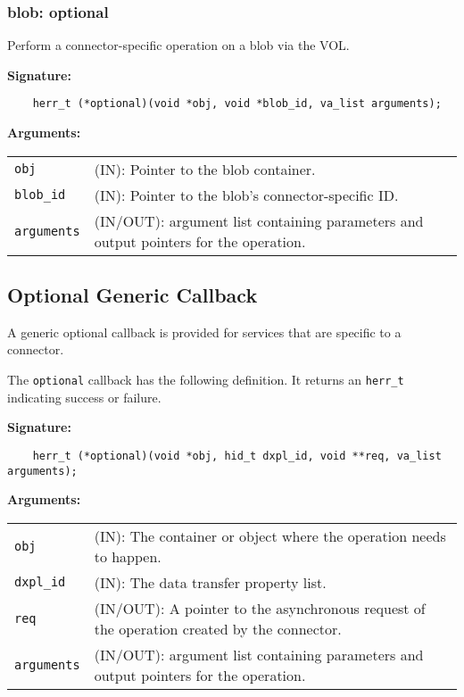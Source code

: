 \subsubsection{blob: optional}
Perform a connector-specific operation on a blob via the VOL.

\begin{mdframed}[style=bgbox]
\textbf{Signature:}
\begin{lstlisting}
    herr_t (*optional)(void *obj, void *blob_id, va_list arguments);             
\end{lstlisting}

\textbf{Arguments:}\\
\begin{tabular}{l p{13.5cm}}
  \texttt{obj} & (IN): Pointer to the blob container.\\
  \texttt{blob\_id} & (IN): Pointer to the blob's connector-specific ID.\\
  \texttt{arguments} & (IN/OUT): argument list containing parameters and output pointers for the operation. \\
\end{tabular}
\end{mdframed}



\subsection{Optional Generic Callback}
A generic optional callback is provided for services that are specific to a connector.

The \texttt{optional} callback has the following definition. It returns an \texttt{herr\_t} indicating success or failure.\bigskip 

\begin{mdframed}[style=bgbox]
\textbf{Signature:}
\begin{lstlisting}
    herr_t (*optional)(void *obj, hid_t dxpl_id, void **req, va_list arguments);
\end{lstlisting}

\textbf{Arguments:}\\
\begin{tabular}{l p{13.5cm}}
  \texttt{obj} & (IN): The container or object where the operation needs to happen.\\
  \texttt{dxpl\_id} & (IN): The data transfer property list.\\
  \texttt{req} & (IN/OUT): A pointer to the asynchronous request of the operation created by the connector.\\
  \texttt{arguments} & (IN/OUT): argument list containing parameters and output pointers for the operation. \\
\end{tabular}
\end{mdframed}

